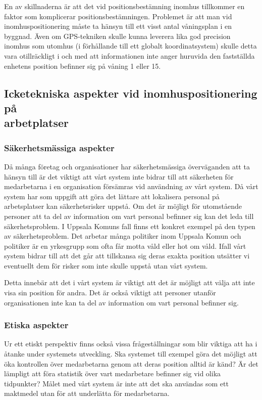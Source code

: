 \documentclass[swedish, a4paper,12pt]{article}
\begin{document}
En av skillnaderna är att det vid positionsbestämning inomhus tillkommer en faktor som komplicerar positionsbestämningen. Problemet är att man vid inomhuspositionering måste ta hänsyn till ett visst antal våningsplan i en byggnad. Även om GPS-tekniken skulle kunna leverera lika god precision inomhus som utomhus (i förhållande till ett globalt koordinatsystem) skulle detta vara otillräckligt i och med att informationen inte anger huruvida den fastställda enhetens position befinner sig på våning 1 eller 15.

\subsection{Icketekniska aspekter vid inomhuspositionering på \\arbetplatser}

\subsubsection{Säkerhetsmässiga aspekter}
Då många företag och organisationer har säkerhetsmässiga överväganden att ta hänsyn till är det viktigt att vårt system inte bidrar till att säkerheten för medarbetarna i en organisation försämras vid användning av vårt system.
Då vårt system har som uppgift att göra det lättare att lokalisera personal på arbetsplatser kan säkerhetsrisker uppstå. Om det är möjligt för utomstående personer att ta del av information om vart personal befinner sig kan det leda till säkerhetsproblem. I Uppsala Komuns fall finns ett konkret exempel på den typen av säkerhetsproblem. Det arbetar många politiker inom Uppsala Komun och politiker är en yrkesgrupp som ofta får motta våld eller hot om våld. Ifall vårt system bidrar till att det går att tillskansa sig deras exakta position utsätter vi eventuellt dem för risker som inte skulle uppstå utan vårt system.

Detta innebär att det i vårt system är viktigt att det är möjligt att välja att inte visa sin position för andra. Det är också viktigt att personer utanför organisationen inte kan ta del av information om vart personal befinner sig.

\newpage
\subsubsection{Etiska aspekter}
Ur ett etiskt perspektiv finns också vissa frågeställningar som blir viktiga att ha i åtanke under systemets utveckling. Ska systemet till exempel göra det möjligt att öka kontrollen över medarbetarna genom att deras position alltid är känd? Är det lämpligt att föra statistik över vart medarbetare befinner sig vid olika tidpunkter?
Målet med vårt system är inte att det ska användas som ett maktmedel utan för att underlätta för medarbetarna.
\end{document}
